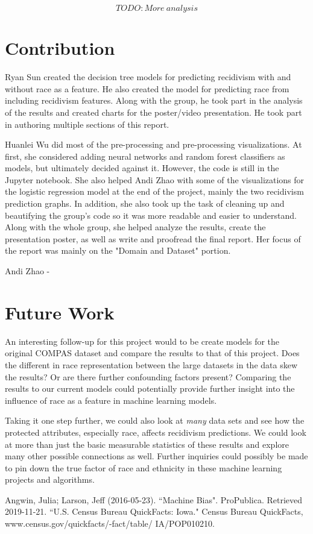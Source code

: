 \documentclass[11pt, sigconf]{acmart}
\begin{document}
$$TODO: More~analysis $$

\section{Contribution}

\hspace{5mm}Ryan Sun created the decision tree models for predicting recidivism with and without race as a feature. He also created the model for predicting race from including recidivism features. Along with the group, he took part in the analysis of the results and created charts for the poster/video presentation. He took part in authoring multiple sections of this report. 

Huanlei Wu did most of the pre-processing and pre-processing visualizations. At first, she considered adding neural networks and random forest classifiers as models, but ultimately decided against it. However, the code is still in the Jupyter notebook. She also helped Andi Zhao with some of the visualizations for the logistic regression model at the end of the project, mainly the two recidivism prediction graphs. In addition, she also took up the task of cleaning up and beautifying the group's code so it was more readable and easier to understand. Along with the whole group, she helped analyze the results, create the presentation poster, as well as write and proofread the final report. Her focus of the report was mainly on the "Domain and Dataset" portion. 

Andi Zhao - 


\section{Future Work}

\hspace{5mm}An interesting follow-up for this project would to be create models for the original COMPAS dataset and compare the results to that of this project. Does the different in race representation between the large datasets in the data skew the results? Or are there further confounding factors present? Comparing the results to our current models could potentially provide further insight into the influence of race as a feature in machine learning models. 

Taking it one step further, we could also look at \emph{many} data sets and see how the protected attributes, especially race, affects recidivism predictions. We could look at more than just the basic measurable statistics of these results and explore many other possible connections as well. Further inquiries could possibly be made to pin down the true factor of race and ethnicity in these machine learning projects and algorithms. 



\begin{thebibliography}{1}

Angwin, Julia; Larson, Jeff (2016-05-23). ``Machine Bias". ProPublica. Retrieved 2019-11-21.
``U.S. Census Bureau QuickFacts: Iowa." Census Bureau QuickFacts, www.census.gov/quickfacts/-fact/table/
IA/POP010210.

\end{thebibliography}
\end{document}
